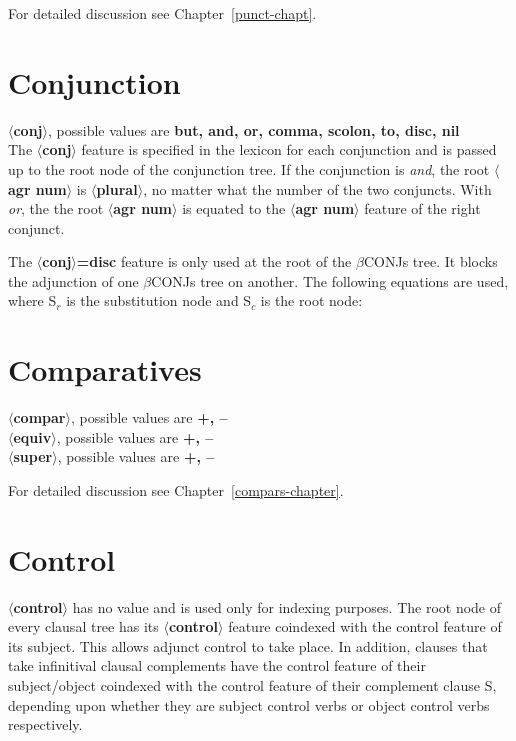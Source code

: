 For detailed discussion see Chapter~\ref{punct-chapt}. 
 
 
\section{Conjunction} 
{\bf $\langle$conj$\rangle$}, possible values are {\bf but, and, or, comma, scolon, to, disc, nil}\\ 
The {\bf $\langle$conj$\rangle$} feature is specified in the lexicon 
for each conjunction and is passed up to the root node 
of the conjunction tree. If the conjunction is {\em and}, the 
root {\bf $\langle$agr num$\rangle$} is {\bf $\langle$plural$\rangle$}, no 
matter what the number of the two conjuncts. With {\em or}, the 
the root {\bf $\langle$agr num$\rangle$} is equated to the 
{\bf $\langle$agr num$\rangle$} feature of the right conjunct. 
 
 
The {\bf $\langle$conj$\rangle$=disc} feature is only used at the root 
of  the 
$\beta$CONJs tree.  It blocks the adjunction of one $\beta$CONJs tree 
on another.  The following equations are used, where S$_{r}$ is 
the substitution node and S$_{c}$ is the root node: 
\beginsentences
{}\label{ex:249} 
\label{ex:250} 
\endsentences

 
 
\section{Comparatives} 
{\bf $\langle$compar$\rangle$}, possible values are {\bf +, --}\\ 
{\bf $\langle$equiv$\rangle$}, possible values are {\bf +, --}\\ 
{\bf $\langle$super$\rangle$}, possible values are {\bf +, --} 
 
For detailed discussion see Chapter~\ref{compars-chapter}. 
 
\section{Control} 
{\bf $\langle$control$\rangle$} has no value and is used only for indexing 
purposes.  The root node of every clausal tree has its {\bf $\langle$control$\rangle$} feature coindexed with the control feature of 
its subject.  This allows adjunct control to take place. In addition, 
clauses that take infinitival clausal complements have the control feature 
of their subject/object coindexed with the control feature of their 
complement clause S, depending upon whether they are subject control verbs 
or object control verbs respectively. 
 
